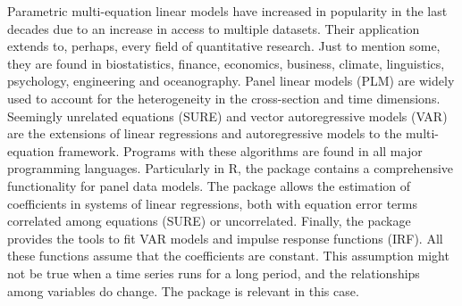 Parametric multi-equation linear models have increased in popularity in the last decades due to an increase in access to multiple datasets. Their application extends to, perhaps, every field of quantitative research. Just to mention some, they are found in biostatistics, finance, economics, business, climate, linguistics, psychology, engineering and oceanography. Panel linear models (PLM) are widely used to account for the heterogeneity in the cross-section and time dimensions. Seemingly unrelated equations (SURE) and vector autoregressive models (VAR) are the extensions of linear regressions and autoregressive models to the multi-equation framework. Programs with these algorithms are found in all major programming languages. Particularly in R, the package  \citep{CroissantMillo2018, CroissantMillo2008} contains a comprehensive functionality for panel data models. The package  \citep{systemfit} allows the estimation of coefficients in systems of linear regressions, both with equation error terms correlated among equations (SURE) or uncorrelated. Finally, the package  \citep{vars} provides the tools to fit VAR models and impulse response functions (IRF). All these functions assume that the coefficients are constant. This assumption might not be true when a time series runs for a long period, and the relationships among variables do change. The package  is relevant in this case.

